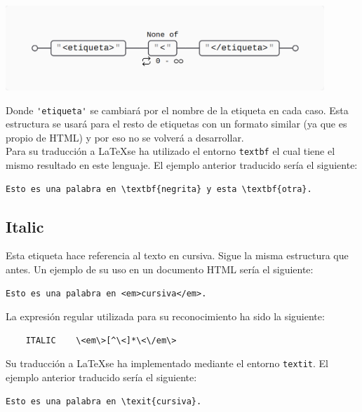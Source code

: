 \documentclass[12pt]{article}
\begin{document}
\begin{center}\includegraphics[width=12cm]{./images/image1.png}\end{center}

Donde \verb|'etiqueta'| se cambiará por el nombre de la etiqueta en cada caso. Esta estructura se usará para el resto de etiquetas con un formato similar (ya que es propio de HTML) y por eso no se volverá a desarrollar.\\

Para su traducción a \LaTeX se ha utilizado el entorno \verb|textbf| el cual tiene el mismo resultado en este lenguaje. El ejemplo anterior traducido sería el siguiente:
\begin{verbatim}
Esto es una palabra en \textbf{negrita} y esta \textbf{otra}.
\end{verbatim}


\subsection{Italic}
Esta etiqueta hace referencia al texto en cursiva. Sigue la misma estructura que antes. Un ejemplo de su uso en un documento HTML sería el siguiente:
\begin{verbatim}
Esto es una palabra en <em>cursiva</em>.
\end{verbatim}
La expresión regular utilizada para su reconocimiento ha sido la siguiente:
\begin{verbatim}
    ITALIC    \<em\>[^\<]*\<\/em\>
\end{verbatim}
Su traducción a \LaTeX se ha implementado mediante el entorno \verb|textit|. El ejemplo anterior traducido sería el siguiente:
\begin{verbatim}
Esto es una palabra en \texit{cursiva}.
\end{verbatim}
\end{document}
